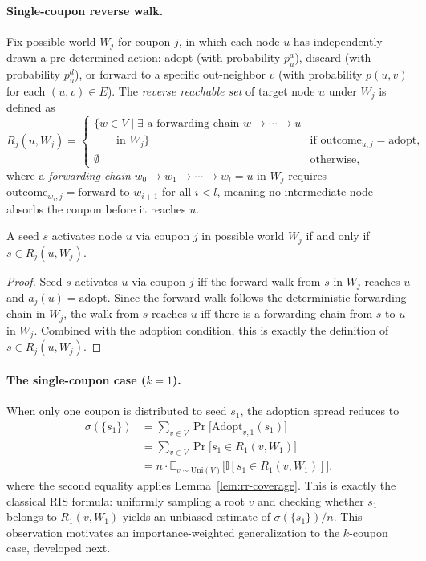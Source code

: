 \documentclass[sigconf]{acmart}
\begin{document}
\paragraph{Single-coupon reverse walk.}
Fix possible world $W_j$ for coupon $j$, in which each node $u$ has independently drawn a pre-determined action: adopt (with probability $p_u^a$), discard (with probability $p_u^d$), or forward to a specific out-neighbor $v$ (with probability $p(u,v)$ for each $(u,v)\in E$). The \emph{reverse reachable set} of target node $u$ under $W_j$ is defined as
\[
  R_j(u, W_j) =
  \begin{cases}
    \{w \in V \mid \exists\text{ a forwarding chain } w \to \cdots \to u \\
    \qquad\text{in } W_j\} & \text{if } \mathrm{outcome}_{u,j} = \text{adopt}, \\
    \emptyset & \text{otherwise,}
  \end{cases}
\]
where a \emph{forwarding chain} $w_0 \to w_1 \to \cdots \to w_l = u$ in $W_j$ requires $\mathrm{outcome}_{w_i,j} = \text{forward-to-}w_{i+1}$ for all $i < l$, meaning no intermediate node absorbs the coupon before it reaches $u$.

\begin{lemma}
\label{lem:rr-coverage}
A seed $s$ activates node $u$ via coupon $j$ in possible world $W_j$ if and only if $s \in R_j(u, W_j)$.
\end{lemma}

\begin{proof}
Seed $s$ activates $u$ via coupon $j$ iff the forward walk from $s$ in $W_j$ reaches $u$ and $a_j(u) = \mathrm{adopt}$. Since the forward walk follows the deterministic forwarding chain in $W_j$, the walk from $s$ reaches $u$ iff there is a forwarding chain from $s$ to $u$ in $W_j$. Combined with the adoption condition, this is exactly the definition of $s \in R_j(u, W_j)$.
\end{proof}

\paragraph{The single-coupon case ($k=1$).}
When only one coupon is distributed to seed $s_1$, the adoption spread reduces to
\begin{align*}
  \sigma(\{s_1\})
  &= \sum_{v \in V} \Pr\bigl[\mathrm{Adopt}_{v,1}(s_1)\bigr] \\
  &= \sum_{v \in V} \Pr\bigl[s_1 \in R_1(v,W_1)\bigr] \\
  &= n\cdot\mathbb{E}_{v\sim\mathrm{Uni}(V)}
     \bigl[\mathbb{I}[s_1 \in R_1(v,W_1)]\bigr].
\end{align*}
where the second equality applies Lemma~\ref{lem:rr-coverage}. This is exactly the classical RIS formula: uniformly sampling a root $v$ and checking whether $s_1$ belongs to $R_1(v,W_1)$ yields an unbiased estimate of $\sigma(\{s_1\})/n$. This observation motivates an importance-weighted generalization to the $k$-coupon case, developed next.
\end{document}
